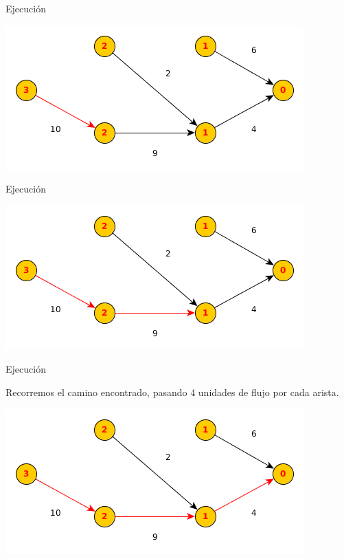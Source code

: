 \documentclass{beamer}
\begin{document}
\begin{frame}{Ejecución}

    
    \includegraphics[scale=0.6]{dinitz/dinitz11.png}
    
\end{frame}

\begin{frame}{Ejecución}

    
    \includegraphics[scale=0.6]{dinitz/dinitz12.png}
    
\end{frame}

\begin{frame}{Ejecución}

    Recorremos el camino encontrado, pasando 4 unidades de flujo por cada arista.
    
    \includegraphics[scale=0.6]{dinitz/dinitz13.png}
    
\end{frame}
\end{document}
